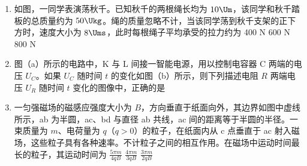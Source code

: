 \documentclass[\gkver]{gaokaozhenti}
\begin{document}
\begin{enumerate}
{故选 B。
}

\item
如图，一同学表演荡秋千。已知秋千的两根绳长均为 $10\Um$，该同学和秋千踏板的总质量约为 $50\Ukg$。绳的质量忽略不计，当该同学荡到秋千支架的正下方时，速度大小为 $8\Ums$，此时每根绳子平均承受的拉力约为
{400 N}
{600 N}
{800 N}

\item
图（a）所示的电路中，K 与 L 间接一智能电源，用以控制电容器 C 两端的电压 $U_{C}$。如果 $U_{C}$ 随时间 $t$ 的变化如图（b）所示，则下列描述电阻 $R$ 两端电压 $U_{R}$ 随时间 $t$ 变化的图像中，正确的是
\onepicture[w=11.0cm]{}
\fourchoices[answer=A, ispicture=true, h=2.0cm]
{}
{}
{}
{}

\item
一匀强磁场的磁感应强度大小为 $B$，方向垂直于纸面向外，其边界如图中虚线所示，ab 为半圆，ac、bd 与直径 ab 共线，ac 间的距离等于半圆的半径。一束质量为 $m$、电荷量为 $q$（$q>0$）的粒子，在纸面内从 c 点垂直于 ac 射入磁场，这些粒子具有各种速率。不计粒子之间的相互作用。在磁场中运动时间最长的粒子，其运动时间为
\onepicture[w=7.0cm]{}
{$\frac{5\pi m}{4qB}$}
{$\frac{4\pi m}{3qB}$}
{$\frac{3\pi m}{2qB}$}
\end{enumerate}
\end{document}
